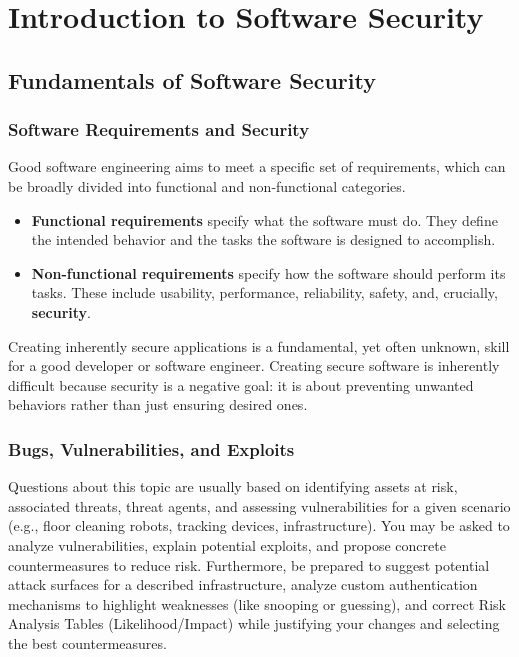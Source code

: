 \chapter{Introduction to Software Security}

\section{Fundamentals of Software Security}
\subsection{Software Requirements and Security}
Good software engineering aims to meet a specific set of requirements, which can be broadly divided into functional and non-functional categories. 
\begin{itemize}
    \item \textbf{Functional requirements} specify what the software must do. They define the intended behavior and the tasks the software is designed to accomplish.
    \item \textbf{Non-functional requirements} specify how the software should perform its tasks. These include usability, performance, reliability, safety, and, crucially, \textbf{security}.
\end{itemize}

Creating inherently secure applications is a fundamental, yet often unknown, skill for a good developer or software engineer. Creating secure software is inherently difficult because security is a negative goal: it is about preventing unwanted behaviors rather than just ensuring desired ones. 

\subsection{Bugs, Vulnerabilities, and Exploits}

\begin{tcolorbox}[colback=blue!5!white,colframe=blue!75!black,title=Exam Insight]
Questions about this topic are usually based on identifying assets at risk, associated threats, threat agents, and assessing vulnerabilities for a given scenario (e.g., floor cleaning robots, tracking devices, infrastructure). You may be asked to analyze vulnerabilities, explain potential exploits, and propose concrete countermeasures to reduce risk. Furthermore, be prepared to suggest potential attack surfaces for a described infrastructure, analyze custom authentication mechanisms to highlight weaknesses (like snooping or guessing), and correct Risk Analysis Tables (Likelihood/Impact) while justifying your changes and selecting the best countermeasures.
\end{tcolorbox}

